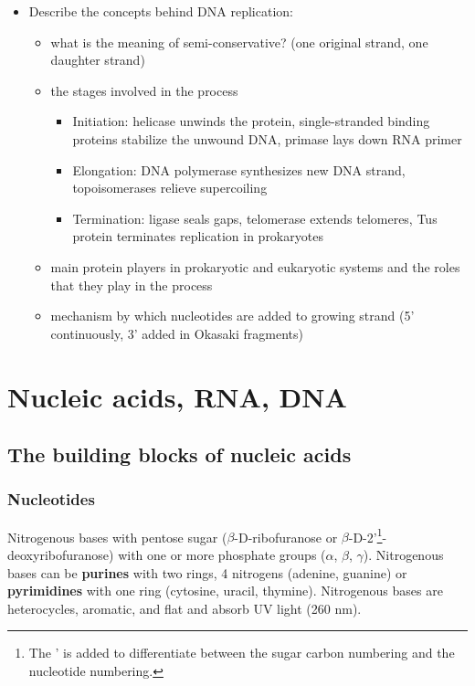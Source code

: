 \documentclass[letterpaper, 12pt]{article}
\begin{document}
\begin{itemize}
\item Describe the concepts behind DNA replication:
\begin{itemize}
\item what is the meaning of semi-conservative? (one original strand, one daughter strand)
\item the stages involved in the process
\begin{itemize}
\item Initiation: helicase unwinds the protein, single-stranded binding proteins stabilize the unwound DNA, primase lays down RNA primer
\item Elongation: DNA polymerase synthesizes new DNA strand, topoisomerases relieve supercoiling
\item Termination: ligase seals gaps, telomerase extends telomeres, Tus protein terminates replication in prokaryotes
\end{itemize}
\item main protein players in prokaryotic and eukaryotic systems and
the roles that they play in the process
\item mechanism by which nucleotides are added to growing strand (5' continuously, 3' added in Okasaki fragments)
\end{itemize}
\end{itemize}

\newpage

\section*{Nucleic acids, RNA, DNA}

\subsection*{The building blocks of nucleic acids}

\subsubsection*{Nucleotides}
Nitrogenous bases with pentose sugar ($\beta$-D-ribofuranose or $\beta$-D-2'\footnote{The ' is added to differentiate between the sugar carbon numbering and the nucleotide numbering.}-deoxyribofuranose) with one or more phosphate groups ($\alpha$, $\beta$, $\gamma$). Nitrogenous bases can be \textbf{purines} with two rings, 4 nitrogens (adenine, guanine) or \textbf{pyrimidines} with one ring (cytosine, uracil, thymine). Nitrogenous bases are heterocycles, aromatic, and flat and absorb UV light (260 nm).
\end{document}
